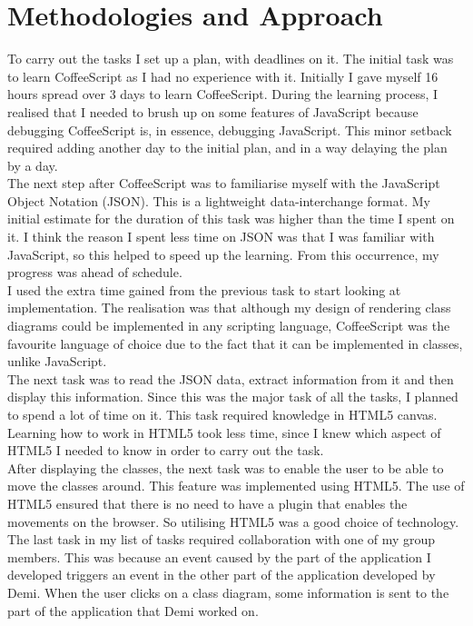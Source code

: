 \documentclass[a4paper,12pt]{article}
\begin{document}
\section{Methodologies and Approach}
To carry out the tasks I set up a plan, with deadlines on it. The initial task was to learn CoffeeScript as I had no experience with it. Initially I gave myself 16 hours spread over 3 days to learn CoffeeScript. During the learning process, I realised that I needed to brush up on some features of JavaScript because debugging CoffeeScript is, in essence, debugging JavaScript. This minor setback required adding another day to the initial plan, and in a way delaying the plan by a day. \\

\indent The next step after CoffeeScript was to familiarise myself with the JavaScript Object Notation (JSON). This is a lightweight data-interchange format. My initial estimate for the duration of this task was higher than the time I spent on it. I think the reason I spent less time on JSON was that I was familiar with JavaScript, so this helped to speed up the learning. From this occurrence, my progress was ahead of schedule.\\

\indent I used the extra time gained from the previous task to start looking at implementation. The realisation was that although my design of rendering class diagrams could be implemented in any scripting language, CoffeeScript was the favourite language of choice due to the fact that it can be implemented in classes, unlike JavaScript.\\

\indent The next task was to read the JSON data, extract information from it and then display this information. Since this was the major task of all the tasks, I planned to spend a lot of time on it. This task required knowledge in HTML5 canvas. Learning how to work in HTML5 took less time, since I knew which aspect of HTML5 I needed to know in order to carry out the task. \\

\indent After displaying the classes, the next task was to enable the user to be able to move the classes around. This feature was implemented using HTML5. The use of HTML5 ensured that there is no need to have a plugin that enables the movements on the browser. So utilising HTML5 was a good choice of technology. 
The last task in my list of tasks required collaboration with one of my group members. This was because an event caused by the part of the application I developed triggers an event in the other part of the application developed by Demi. When the user clicks on a class diagram, some information is sent to the part of the application that Demi worked on. \\
\end{document}

